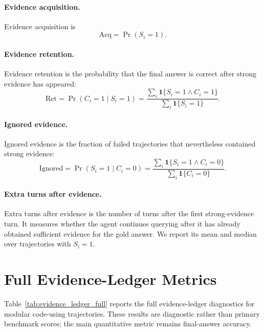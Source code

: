 \documentclass{article}
\begin{document}
\paragraph{Evidence acquisition.}
Evidence acquisition is
\[
    \mathrm{Acq}
    =
    \Pr(S_i=1).
\]

\paragraph{Evidence retention.}
Evidence retention is the probability that the final answer is correct after strong evidence has appeared:
\[
    \mathrm{Ret}
    =
    \Pr(C_i=1 \mid S_i=1)
    =
    \frac{\sum_i \mathbf{1}\{S_i=1 \wedge C_i=1\}}
         {\sum_i \mathbf{1}\{S_i=1\}} .
\]

\paragraph{Ignored evidence.}
Ignored evidence is the fraction of failed trajectories that nevertheless contained strong evidence:
\[
    \mathrm{Ignored}
    =
    \Pr(S_i=1 \mid C_i=0)
    =
    \frac{\sum_i \mathbf{1}\{S_i=1 \wedge C_i=0\}}
         {\sum_i \mathbf{1}\{C_i=0\}} .
\]

\paragraph{Extra turns after evidence.}
Extra turns after evidence is the number of turns after the first strong-evidence turn.
It measures whether the agent continues querying after it has already obtained sufficient evidence for the gold answer.
We report its mean and median over trajectories with $S_i=1$.

\section{Full Evidence-Ledger Metrics}
\label{app:ledger_full}

Table~\ref{tab:evidence_ledger_full} reports the full evidence-ledger diagnostics for modular code-using trajectories.
These results are diagnostic rather than primary benchmark scores; the main quantitative metric remains final-answer accuracy.
\end{document}
